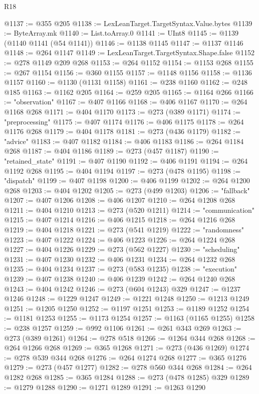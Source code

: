 \begin{lexlean}{R18}
\begin{coremodule}
{{{{{{{{{{{{{{{{{{{@1137 := @355 @205
@1138 := LexLeanTarget.TargetSyntax.Value.bytes
@1139 := ByteArray.mk
@1140 := List.toArray.{0}
@1141 := UInt8
@1145 := @1139 (@1140 @1141 (@54 @1141))
@1146 := @1138 @1145
@1147 := @1137 @1146
@1148 := @264 @1147
@1149 := LexLeanTarget.TargetSyntax.Shape.false
@1152 := @278 @1149 @209 @268
@1153 := @264 @1152
@1154 := @1153 @268
@1155 := @267 @1154
@1156 := @360 @1155
@1157 := @1148 @1156
@1158 := @1136 @1157
@1160 := @1130 (@1131 @1158)
@1161 := @238 @1160
@1162 := @248 @185
@1163 := @1162 @205
@1164 := @259 @205
@1165 := @1164 @266
@1166 := "observation"
@1167 := @407 @1166
@1168 := @406 @1167
@1170 := @264 @1168 @268
@1171 := @404 @1170
@1173 := @273 (@389 @1171)
@1174 := "preprocessing"
@1175 := @407 @1174
@1176 := @406 @1175
@1178 := @264 @1176 @268
@1179 := @404 @1178
@1181 := @273 (@436 @1179)
@1182 := "advice"
@1183 := @407 @1182
@1184 := @406 @1183
@1186 := @264 @1184 @268
@1187 := @404 @1186
@1189 := @273 (@457 @1187)
@1190 := "retained_state"
@1191 := @407 @1190
@1192 := @406 @1191
@1194 := @264 @1192 @268
@1195 := @404 @1194
@1197 := @273 (@478 @1195)
@1198 := "dispatch"
@1199 := @407 @1198
@1200 := @406 @1199
@1202 := @264 @1200 @268
@1203 := @404 @1202
@1205 := @273 (@499 @1203)
@1206 := "fallback"
@1207 := @407 @1206
@1208 := @406 @1207
@1210 := @264 @1208 @268
@1211 := @404 @1210
@1213 := @273 (@520 @1211)
@1214 := "communication"
@1215 := @407 @1214
@1216 := @406 @1215
@1218 := @264 @1216 @268
@1219 := @404 @1218
@1221 := @273 (@541 @1219)
@1222 := "randomness"
@1223 := @407 @1222
@1224 := @406 @1223
@1226 := @264 @1224 @268
@1227 := @404 @1226
@1229 := @273 (@562 @1227)
@1230 := "scheduling"
@1231 := @407 @1230
@1232 := @406 @1231
@1234 := @264 @1232 @268
@1235 := @404 @1234
@1237 := @273 (@583 @1235)
@1238 := "execution"
@1239 := @407 @1238
@1240 := @406 @1239
@1242 := @264 @1240 @268
@1243 := @404 @1242
@1246 := @273 (@604 @1243) @329
@1247 := @1237 @1246
@1248 := @1229 @1247
@1249 := @1221 @1248
@1250 := @1213 @1249
@1251 := @1205 @1250
@1252 := @1197 @1251
@1253 := @1189 @1252
@1254 := @1181 @1253
@1255 := @1173 @1254
@1257 := @1163 (@1165 @1255)
@1258 := @238 @1257
@1259 := @992 @1106
@1261 := @261 @343 @269
@1263 := @273 (@389 @1261)
@1264 := @278 @518
@1266 := @1264 @344 @268
@1268 := @264 @1266 @268
@1269 := @365 @1268
@1271 := @273 (@436 @1269)
@1274 := @278 @539 @344 @268
@1276 := @264 @1274 @268
@1277 := @365 @1276
@1279 := @273 (@457 @1277)
@1282 := @278 @560 @344 @268
@1284 := @264 @1282 @268
@1285 := @365 @1284
@1288 := @273 (@478 @1285) @329
@1289 := @1279 @1288
@1290 := @1271 @1289
@1291 := @1263 @1290
}}}}}}}}}}}}}}}}}}}
\end{coremodule}
\end{lexlean}

